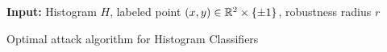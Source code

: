 
\begin{algorithm}[H]
    \SetAlgoLined
    {\bfseries Input:} Histogram $H$, labeled point $(x,y) \in \mathbb R^2 \times \{\pm 1\}$, robustness radius $r$\;
    
    

\caption{Optimal attack algorithm for Histogram Classifiers}
\end{algorithm}
 